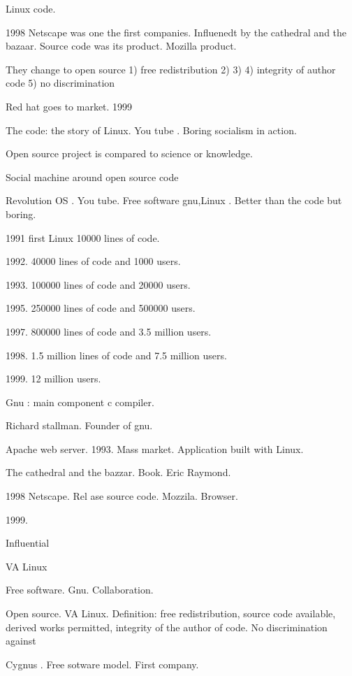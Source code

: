   Linux code. 
  
  
  1998 Netscape was one the first companies.
  Influenedt by the cathedral and the bazaar. 
  Source code was its product. Mozilla product. 
  
  They change to open source 
  1) free redistribution 
  2) 
  3) 
  4) integrity of author code 
  5) no discrimination  
  
  
  Red hat goes to market. 1999
  
  The code: the story of Linux. You tube . Boring  socialism in action. 
  
  Open source project is compared to science or knowledge. 
  
  
  Social machine around open source code 
  
  Revolution OS . You tube. Free software gnu,Linux . Better than the code but boring. 
  
  1991 first Linux 10000 lines of code. 
  
  1992. 40000 lines of code and 1000 users. 
  
  1993. 100000 lines of code and 20000 users. 
  
  1995. 250000 lines of code and 500000 users.
  
  1997. 800000 lines of code and 3.5 million users.  
  
  1998. 1.5 million lines of code and 7.5 million users. 
  
  1999. 12 million users. 
  
  
  
  Gnu : main component c compiler. 
  
  Richard stallman. Founder of gnu. 
  
  Apache web server. 1993. Mass market. 
  Application built with Linux. 
  
  
  The cathedral and the bazzar. Book. Eric Raymond. 
  
  
  
  1998 Netscape. Rel ase source code. Mozzila. Browser. 
  
  1999. 
  
  Influential 
  
  
  VA Linux 
  
  Free software. Gnu. Collaboration. 
  
  Open source. VA Linux. 
  Definition: free redistribution, source code available, derived works permitted, integrity of the author of code. No discrimination against 
  
  Cygnus . Free sotware model.  First company. 
  
